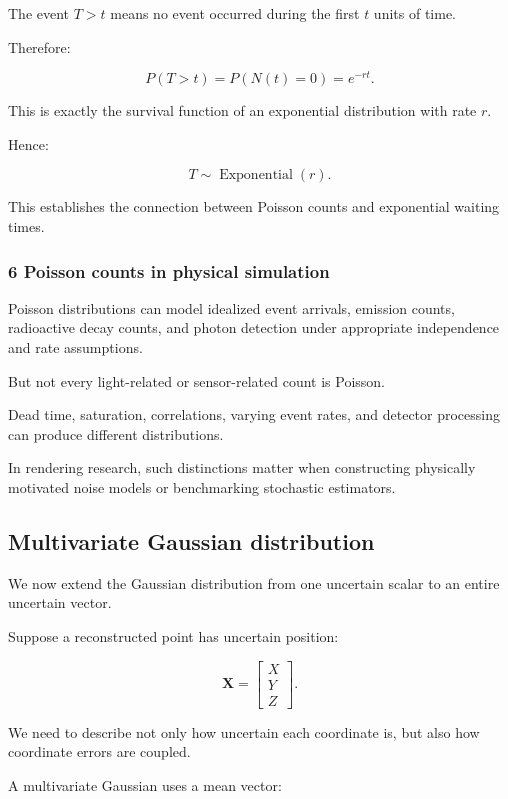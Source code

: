 The event \(T>t\) means no event occurred during the first \(t\) units of time.

Therefore:

\[
 P(T>t)=P(N(t)=0)=e^{-rt}.
\]

This is exactly the survival function of an exponential distribution with rate \(r\).

Hence:

\[
 \boxed{ T\sim\operatorname{Exponential}(r) }.
\]

This establishes the connection between Poisson counts and exponential waiting times.

\subsubsection{6 Poisson counts in physical simulation}\label{02-foundations-ii-ch024-poisson-counts-in-physical-simulation}

Poisson distributions can model idealized event arrivals, emission counts, radioactive decay counts, and photon detection under appropriate independence and rate assumptions.

But not every light-related or sensor-related count is Poisson.

Dead time, saturation, correlations, varying event rates, and detector processing can produce different distributions.

In rendering research, such distinctions matter when constructing physically motivated noise models or benchmarking stochastic estimators.

\subsection{Multivariate Gaussian distribution}\label{02-foundations-ii-ch024-multivariate-gaussian-distribution}

We now extend the Gaussian distribution from one uncertain scalar to an entire uncertain vector.

Suppose a reconstructed point has uncertain position:

\[
 \mathbf X= \begin{bmatrix} X\\Y\\Z \end{bmatrix}.
\]

We need to describe not only how uncertain each coordinate is, but also how coordinate errors are coupled.

A multivariate Gaussian uses a mean vector:

